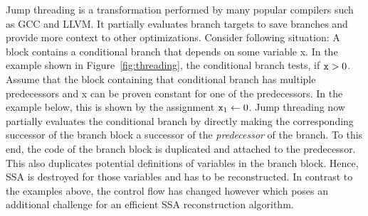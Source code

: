 Jump threading is a transformation performed by many popular compilers such as GCC and LLVM.
It partially evaluates branch targets to save branches and provide more context to other optimizations.
Consider following situation:
A block contains a conditional branch that depends on some variable \var x.
In the example shown in Figure~\ref{fig:threading}, the conditional branch tests, if $\mathtt{x}> 0$.
Assume that the block containing that conditional branch has multiple predecessors and \var x can be proven constant for one of the predecessors.
In the example below, this is shown by the assignment $\mathtt{x}_1\gets 0$. 
Jump threading now partially evaluates the conditional branch by directly making the corresponding successor of the branch block a successor of the \emph{predecessor} of the branch.
To this end, the code of the branch block is duplicated and attached to the predecessor. 
This also duplicates potential definitions of variables in the branch block.
Hence, SSA is destroyed for those variables and has to be reconstructed. 
In contrast to the examples above, the control flow has changed however which poses an additional challenge for an efficient SSA reconstruction algorithm. 
